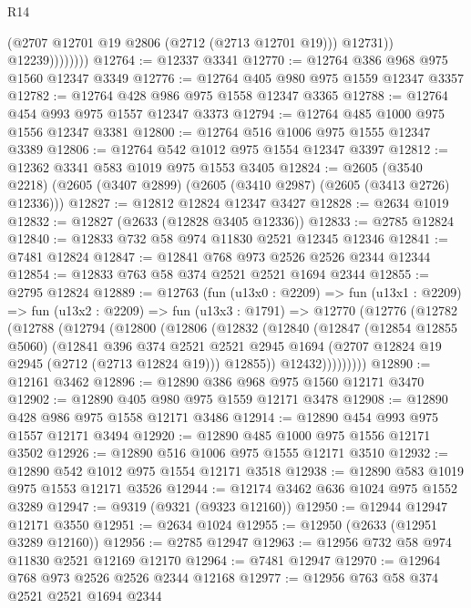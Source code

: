 \begin{lexlean}{R14}
\begin{coremodule}
                        (@2707 @12701 @19 @2806 (@2712 (@2713 @12701 @19)))
                        @12731))
                    @12239))))))))
@12764 := @12337 @3341
@12770 := @12764 @386 @968 @975 @1560 @12347 @3349
@12776 := @12764 @405 @980 @975 @1559 @12347 @3357
@12782 := @12764 @428 @986 @975 @1558 @12347 @3365
@12788 := @12764 @454 @993 @975 @1557 @12347 @3373
@12794 := @12764 @485 @1000 @975 @1556 @12347 @3381
@12800 := @12764 @516 @1006 @975 @1555 @12347 @3389
@12806 := @12764 @542 @1012 @975 @1554 @12347 @3397
@12812 := @12362 @3341 @583 @1019 @975 @1553 @3405
@12824 := @2605
    (@3540 @2218)
    (@2605 (@3407 @2899) (@2605 (@3410 @2987) (@2605 (@3413 @2726) @12336)))
@12827 := @12812 @12824 @12347 @3427
@12828 := @2634 @1019
@12832 := @12827 (@2633 (@12828 @3405 @12336))
@12833 := @2785 @12824
@12840 := @12833 @732 @58 @974 @11830 @2521 @12345 @12346
@12841 := @7481 @12824
@12847 := @12841 @768 @973 @2526 @2526 @2344 @12344
@12854 := @12833 @763 @58 @374 @2521 @2521 @1694 @2344
@12855 := @2795 @12824
@12889 := @12763
    (fun (u13x0 : @2209) =>
    fun (u13x1 : @2209) =>
    fun (u13x2 : @2209) =>
    fun (u13x3 : @1791) =>
    @12770
      (@12776
        (@12782
          (@12788
            (@12794
              (@12800
                (@12806
                  (@12832
                    (@12840
                      (@12847
                        (@12854 @12855 @5060)
                        (@12841
                          @396
                          @374
                          @2521
                          @2521
                          @2945
                          @1694
                          (@2707 @12824 @19 @2945 (@2712 (@2713 @12824 @19)))
                          @12855))
                      @12432)))))))))
@12890 := @12161 @3462
@12896 := @12890 @386 @968 @975 @1560 @12171 @3470
@12902 := @12890 @405 @980 @975 @1559 @12171 @3478
@12908 := @12890 @428 @986 @975 @1558 @12171 @3486
@12914 := @12890 @454 @993 @975 @1557 @12171 @3494
@12920 := @12890 @485 @1000 @975 @1556 @12171 @3502
@12926 := @12890 @516 @1006 @975 @1555 @12171 @3510
@12932 := @12890 @542 @1012 @975 @1554 @12171 @3518
@12938 := @12890 @583 @1019 @975 @1553 @12171 @3526
@12944 := @12174 @3462 @636 @1024 @975 @1552 @3289
@12947 := @9319 (@9321 (@9323 @12160))
@12950 := @12944 @12947 @12171 @3550
@12951 := @2634 @1024
@12955 := @12950 (@2633 (@12951 @3289 @12160))
@12956 := @2785 @12947
@12963 := @12956 @732 @58 @974 @11830 @2521 @12169 @12170
@12964 := @7481 @12947
@12970 := @12964 @768 @973 @2526 @2526 @2344 @12168
@12977 := @12956 @763 @58 @374 @2521 @2521 @1694 @2344

\end{coremodule}
\end{lexlean}

